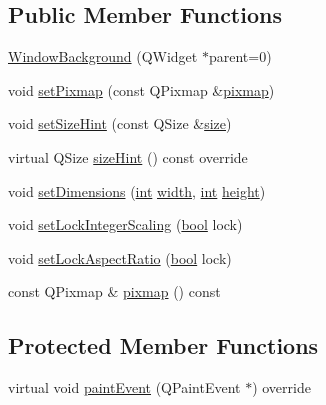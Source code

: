 \subsection*{Public Member Functions}
\begin{DoxyCompactItemize}
\item 
\mbox{\hyperlink{class_q_g_b_a_1_1_window_background_ac9caf9140745aebb14db70bf3b9843d8}{Window\+Background}} (Q\+Widget $\ast$parent=0)
\item 
void \mbox{\hyperlink{class_q_g_b_a_1_1_window_background_ab7e1ca3a613b5adda53295f2dfc2f9a4}{set\+Pixmap}} (const Q\+Pixmap \&\mbox{\hyperlink{class_q_g_b_a_1_1_window_background_a6d7ad776b592f3fde80b38238c582635}{pixmap}})
\item 
void \mbox{\hyperlink{class_q_g_b_a_1_1_window_background_a037a6e2b520926ee2bb6aa4ce864aa11}{set\+Size\+Hint}} (const Q\+Size \&\mbox{\hyperlink{ioapi_8h_a014d89bd76f74ef3a29c8f04b473eb76}{size}})
\item 
virtual Q\+Size \mbox{\hyperlink{class_q_g_b_a_1_1_window_background_a4dff2bccdcecd03b492d0dbf1e53b01b}{size\+Hint}} () const override
\item 
void \mbox{\hyperlink{class_q_g_b_a_1_1_window_background_a3e47a38bfb0c61fd412da8de97441789}{set\+Dimensions}} (\mbox{\hyperlink{ioapi_8h_a787fa3cf048117ba7123753c1e74fcd6}{int}} \mbox{\hyperlink{readppm_8c_a59b7c57bf1dc7c36ac7c8232cf5bb713}{width}}, \mbox{\hyperlink{ioapi_8h_a787fa3cf048117ba7123753c1e74fcd6}{int}} \mbox{\hyperlink{readppm_8c_ac8b624a7354198da45f5797b93b883c9}{height}})
\item 
void \mbox{\hyperlink{class_q_g_b_a_1_1_window_background_a53952d8416bfb418c1c44bb46379ce92}{set\+Lock\+Integer\+Scaling}} (\mbox{\hyperlink{libretro_8h_a4a26dcae73fb7e1528214a068aca317e}{bool}} lock)
\item 
void \mbox{\hyperlink{class_q_g_b_a_1_1_window_background_ae59914eea83da70457ef3a16cc954898}{set\+Lock\+Aspect\+Ratio}} (\mbox{\hyperlink{libretro_8h_a4a26dcae73fb7e1528214a068aca317e}{bool}} lock)
\item 
const Q\+Pixmap \& \mbox{\hyperlink{class_q_g_b_a_1_1_window_background_a6d7ad776b592f3fde80b38238c582635}{pixmap}} () const
\end{DoxyCompactItemize}
\subsection*{Protected Member Functions}
\begin{DoxyCompactItemize}
\item 
virtual void \mbox{\hyperlink{class_q_g_b_a_1_1_window_background_acb7588a6944460adab62af3935ef5ab4}{paint\+Event}} (Q\+Paint\+Event $\ast$) override
\end{DoxyCompactItemize}

